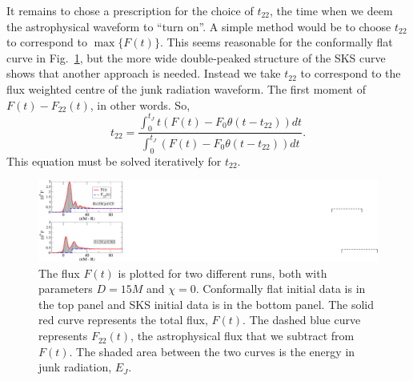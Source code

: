 It remains to chose a prescription for the choice of $t_{22}$, the
time when we deem the astrophysical waveform to ``turn on''.
A simple method would be to choose
$t_{22}$ to correspond to $\max\{F(t)\}$. This seems reasonable for
the conformally flat curve in Fig.~\ref{fig:FluxSample}, but the
more wide double-peaked structure of the SKS curve shows that another
approach is needed. Instead we take $t_{22}$ to correspond to the flux
weighted centre of the junk radiation waveform. The first moment of
$F(t)-F_{22}(t)$, in other words. So,
\begin{equation}\label{eq:t22}
t_{22}=\frac{\int_0^{t_J}{t(F(t)-F_0\theta(t-t_{22}))dt}}{\int_0^{t_J}{(F(t)-F_0\theta(t-t_{22}))dt}}.
\end{equation}
This equation must be solved iteratively for $t_{22}$.

\begin{figure}
 \includegraphics[scale=0.95]{chap5/FluxSample}
  \caption{The flux $F(t)$ is plotted for two different runs, both
    with parameters $D=15M$ and $\chi=0$. Conformally flat initial
    data is in the top panel and SKS initial data is in the bottom
    panel. The solid red curve represents the total flux, $F(t)$. The
    dashed blue curve represents $F_{22}(t)$, the astrophysical flux
    that we subtract from $F(t)$. The shaded area between the two
    curves is the energy in junk radiation, $E_J$.
}
  \label{fig:FluxSample}
\end{figure}

